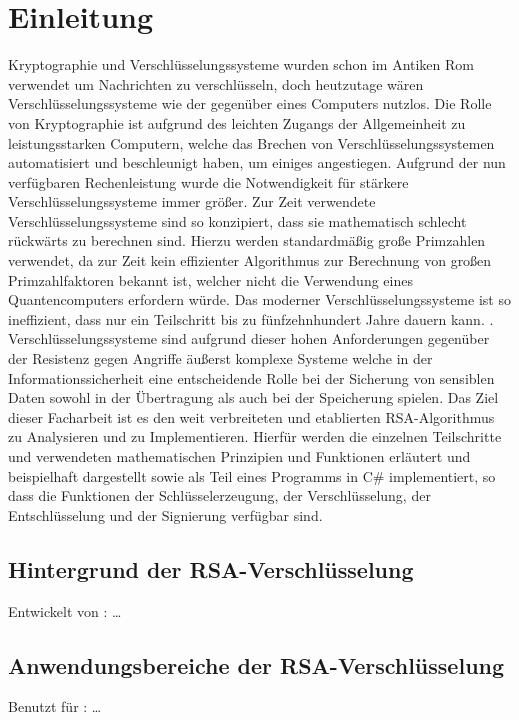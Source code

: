 \chapter{Einleitung}

Kryptographie und Verschlüsselungssysteme wurden schon im Antiken Rom verwendet um Nachrichten zu verschlüsseln\cite{aichner22}, doch heutzutage wären Verschlüsselungssysteme wie der  gegenüber eines Computers nutzlos.
Die Rolle von Kryptographie ist aufgrund des leichten Zugangs der Allgemeinheit zu leistungsstarken Computern, welche das Brechen von  Verschlüsselungssystemen automatisiert und beschleunigt haben, um einiges angestiegen.
Aufgrund der nun verfügbaren Rechenleistung wurde die Notwendigkeit für stärkere Verschlüsselungssysteme immer größer. Zur Zeit verwendete Verschlüsselungssysteme sind so konzipiert, dass sie mathematisch schlecht rückwärts zu berechnen sind.
Hierzu werden standardmäßig große Primzahlen verwendet, da zur Zeit kein effizienter Algorithmus zur Berechnung von großen Primzahlfaktoren bekannt ist, welcher nicht die Verwendung eines Quantencomputers erfordern würde.
Das  moderner Verschlüsselungssysteme ist so ineffizient, dass nur ein Teilschritt bis zu fünfzehnhundert Jahre dauern kann\cite{kleinjung10}.
\cite{kleinjung10}.
Verschlüsselungssysteme sind aufgrund dieser hohen Anforderungen gegenüber der Resistenz gegen Angriffe äußerst komplexe Systeme welche in der Informationssicherheit eine entscheidende Rolle bei der Sicherung von sensiblen Daten sowohl in der Übertragung als auch bei der Speicherung spielen\cite{aichner22}.
Das Ziel dieser Facharbeit ist es den weit verbreiteten und etablierten RSA-Algorithmus zu Analysieren und zu Implementieren. Hierfür werden die einzelnen Teilschritte und verwendeten mathematischen Prinzipien und Funktionen erläutert und beispielhaft dargestellt sowie als Teil eines Programms in C\# implementiert, so dass die Funktionen der Schlüsselerzeugung, der Verschlüsselung, der Entschlüsselung und der Signierung verfügbar sind.
\newpage

\section{Hintergrund der RSA-Verschlüsselung}

Entwickelt von : \ldots

\newpage
\section{Anwendungsbereiche der RSA-Verschlüsselung}

Benutzt für : \ldots
